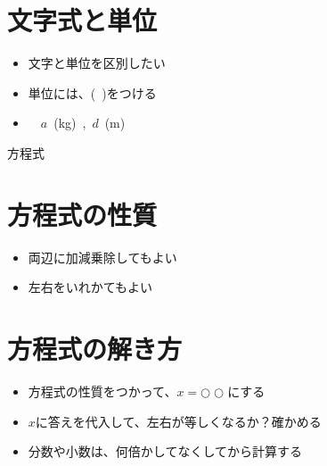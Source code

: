 ﻿\documentclass{jsarticle}
\begin{document}
\section{文字式と単位}
\begin{itemize}
\item 文字と単位を区別したい
\item 単位には、(\ )をつける
\item {} \ \ $a$\ (kg)\ ,\ $d$\ (m)
\end{itemize}


\newpage

{\LARGE \noindent 方程式}

\section{方程式の性質}
\begin{itemize}
\item 両辺に加減乗除してもよい
\item 左右をいれかてもよい
\end{itemize}

\section{方程式の解き方}
\begin{itemize}
\item 方程式の性質をつかって、$x=○○$にする
\item $x$に答えを代入して、左右が等しくなるか？確かめる
\item 分数や小数は、何倍かしてなくしてから計算する
\end{itemize}
\end{document}

